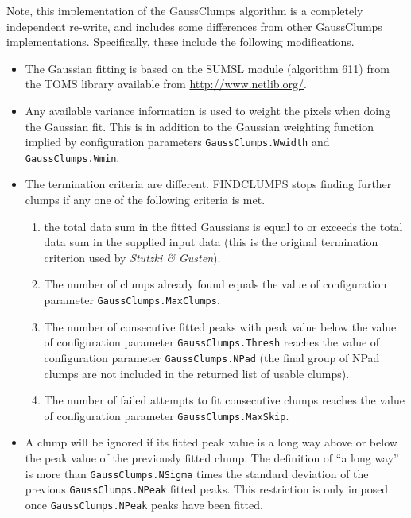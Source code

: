 \documentclass[twoside,11pt]{starlink}
\begin{document}
Note, this implementation of the GaussClumps algorithm is a completely
independent re-write, and includes some differences from other
GaussClumps implementations. Specifically, these include the following
modifications.

\begin{itemize}

\item The Gaussian fitting is based on the SUMSL module (algorithm 611)
from the TOMS library available from
\url{http://www.netlib.org/}.

\item Any available variance information is used to weight the pixels
when doing the Gaussian fit. This is in addition to the Gaussian
weighting function implied by configuration parameters
\texttt{GaussClumps.Wwidth} and \texttt{GaussClumps.Wmin}.

\item The termination criteria are different. FINDCLUMPS stops finding
further clumps if any one of the following criteria is met.

\begin{enumerate}

\item the total data sum in the fitted Gaussians is equal to or exceeds
the total data sum in the supplied input data (this is the original
termination criterion used by \emph{Stutzki \& Gusten}).

\item The number of clumps already found equals the value of
configuration parameter \texttt{GaussClumps.MaxClumps}.

\item The number of consecutive fitted peaks with peak value below the
value of configuration parameter \texttt{GaussClumps.Thresh} reaches the value of
configuration parameter \texttt{GaussClumps.NPad} (the final group of NPad clumps
are not included in the returned list of usable clumps).

\item The number of failed attempts to fit consecutive clumps reaches
the value of configuration parameter \texttt{GaussClumps.MaxSkip}.

\end{enumerate}

\item A clump will be ignored if its fitted peak value is a long way above or
below the peak value of the previously fitted clump. The definition of
``a long way'' is more than \texttt{GaussClumps.NSigma} times the standard
deviation of the previous \texttt{GaussClumps.NPeak} fitted peaks. This
restriction is only imposed once \texttt{GaussClumps.NPeak} peaks have been
fitted.


\end{itemize}
\end{document}
